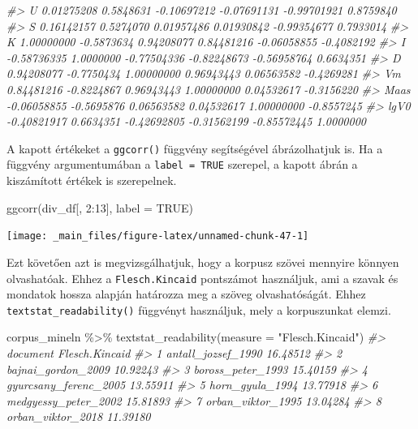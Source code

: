 \documentclass[
]{book}
\newenvironment{Shaded}{\begin{snugshade}}{\end{snugshade}}
\newcommand{\AttributeTok}[1]{\textcolor[rgb]{0.77,0.63,0.00}{#1}}
\newcommand{\CommentTok}[1]{\textcolor[rgb]{0.56,0.35,0.01}{\textit{#1}}}
\newcommand{\ConstantTok}[1]{\textcolor[rgb]{0.00,0.00,0.00}{#1}}
\newcommand{\DecValTok}[1]{\textcolor[rgb]{0.00,0.00,0.81}{#1}}
\newcommand{\FunctionTok}[1]{\textcolor[rgb]{0.00,0.00,0.00}{#1}}
\newcommand{\NormalTok}[1]{#1}
\newcommand{\SpecialCharTok}[1]{\textcolor[rgb]{0.00,0.00,0.00}{#1}}
\newcommand{\StringTok}[1]{\textcolor[rgb]{0.31,0.60,0.02}{#1}}
\begin{document}
\begin{Shaded}
\begin{Highlighting}[]
\CommentTok{\#\textgreater{} U     0.01275208  0.5848631 {-}0.10697212 {-}0.07691131 {-}0.99701921  0.8759840}
\CommentTok{\#\textgreater{} S     0.16142157  0.5274070  0.01957486  0.01930842 {-}0.99354677  0.7933014}
\CommentTok{\#\textgreater{} K     1.00000000 {-}0.5873634  0.94208077  0.84481216 {-}0.06058855 {-}0.4082192}
\CommentTok{\#\textgreater{} I    {-}0.58736335  1.0000000 {-}0.77504336 {-}0.82248673 {-}0.56958764  0.6634351}
\CommentTok{\#\textgreater{} D     0.94208077 {-}0.7750434  1.00000000  0.96943443  0.06563582 {-}0.4269281}
\CommentTok{\#\textgreater{} Vm    0.84481216 {-}0.8224867  0.96943443  1.00000000  0.04532617 {-}0.3156220}
\CommentTok{\#\textgreater{} Maas {-}0.06058855 {-}0.5695876  0.06563582  0.04532617  1.00000000 {-}0.8557245}
\CommentTok{\#\textgreater{} lgV0 {-}0.40821917  0.6634351 {-}0.42692805 {-}0.31562199 {-}0.85572445  1.0000000}
\end{Highlighting}
\end{Shaded}

A kapott értékeket a \texttt{ggcorr()} függvény segítségével
ábrázolhatjuk is. Ha a függvény argumentumában a \texttt{label\ =\ TRUE}
szerepel, a kapott ábrán a kiszámított értékek is szerepelnek.

\begin{Shaded}
\begin{Highlighting}[]
\FunctionTok{ggcorr}\NormalTok{(div\_df[, }\DecValTok{2}\SpecialCharTok{:}\DecValTok{13}\NormalTok{], }\AttributeTok{label =} \ConstantTok{TRUE}\NormalTok{)}
\end{Highlighting}
\end{Shaded}

\begin{center}\texttt{[image: \_main\_files/figure-latex/unnamed-chunk-47-1]} \end{center}

Ezt követően azt is megvizsgálhatjuk, hogy a korpusz szövei mennyire
könnyen olvashatóak. Ehhez a \texttt{Flesch.Kincaid} pontszámot
használjuk, ami a szavak és mondatok hossza alapján határozza meg a
szöveg olvashatóságát. Ehhez \texttt{textstat\_readability()} függvényt
használjuk, mely a korpuszunkat elemzi.

\begin{Shaded}
\begin{Highlighting}[]
\NormalTok{corpus\_mineln }\SpecialCharTok{\%\textgreater{}\%}
  \FunctionTok{textstat\_readability}\NormalTok{(}\AttributeTok{measure =} \StringTok{"Flesch.Kincaid"}\NormalTok{)}
\CommentTok{\#\textgreater{}                document Flesch.Kincaid}
\CommentTok{\#\textgreater{} 1    antall\_jozsef\_1990       16.48512}
\CommentTok{\#\textgreater{} 2    bajnai\_gordon\_2009       10.92243}
\CommentTok{\#\textgreater{} 3     boross\_peter\_1993       15.40159}
\CommentTok{\#\textgreater{} 4 gyurcsany\_ferenc\_2005       13.55911}
\CommentTok{\#\textgreater{} 5       horn\_gyula\_1994       13.77918}
\CommentTok{\#\textgreater{} 6  medgyessy\_peter\_2002       15.81893}
\CommentTok{\#\textgreater{} 7     orban\_viktor\_1995       13.04284}
\CommentTok{\#\textgreater{} 8     orban\_viktor\_2018       11.39180}
\end{Highlighting}
\end{Shaded}
\end{document}
